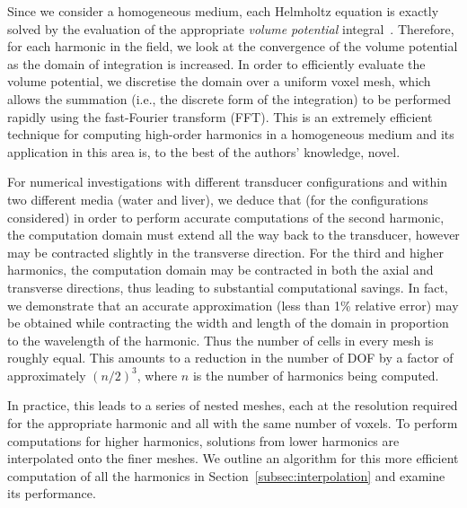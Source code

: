 \documentclass[preprint]{JASA}
\begin{document}
Since we consider a homogeneous medium, each Helmholtz equation is exactly solved 
by the evaluation of the appropriate \textit{volume potential} integral~\cite{costabel2015spectrum}. 
Therefore, 
for each harmonic in the field, we look at the convergence of the volume potential 
as the domain of integration is increased. In order to efficiently evaluate the 
volume potential, we discretise the domain over a uniform voxel mesh, which allows the 
summation (i.e., the discrete form of the integration) to be performed rapidly 
using the fast-Fourier transform (FFT). This is an extremely efficient technique 
for computing high-order harmonics in a homogeneous medium and its application in 
this area is, to the best of the authors' knowledge, novel.

For numerical investigations with different transducer configurations and within 
two different media (water and liver), we deduce that (for the configurations 
considered) in order to perform accurate computations of the second harmonic, the computation 
domain must extend all the way back to the transducer, however may be contracted 
slightly in the transverse direction. For the third and higher harmonics, the 
computation domain may be contracted in both the axial and transverse directions, 
thus leading to substantial computational savings. In fact, we demonstrate that 
an accurate approximation (less than 1\% relative error) may be obtained while 
contracting the width and length
of the domain in proportion to the wavelength of the harmonic. Thus the number
of cells in every mesh is roughly equal. This amounts to a reduction in 
the number of DOF by a factor of approximately $(n/2)^3$, where $n$ is the number of harmonics 
being computed.

In practice, this leads to a series of nested meshes, each at the resolution
required for the appropriate harmonic and all with the same number of voxels.
To perform computations for higher harmonics, solutions from lower harmonics are 
interpolated onto the finer meshes. We outline an algorithm for this more 
efficient computation of all the harmonics in Section~\ref{subsec:interpolation}
and examine its performance.
\end{document}
